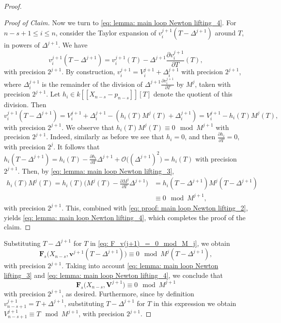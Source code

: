 \documentclass[pdflatex,sn-basic]{sn-jnl}%
\theoremstyle{thmstyleone}%
\theoremstyle{thmstyletwo}%
\theoremstyle{thmstylethree}%
\theoremstyle{definition}
\numberwithin{equation}{section}
\newcommand{\bfs}{\boldsymbol}
\begin{document}
\begin{proof}
\begin{proof}[Proof of Claim]
Now we turn to \eqref{eq: lemma: main loop Newton
lifting_4}. For $n-s+1\le i\le n$, consider the Taylor expansion of
$v^{j+1}_i(T-\Delta^{j+1})$ around $T$, in
powers of $\Delta^{j+1}$. We have
$$
v^{j+1}_i(T-\Delta^{j+1})=v^{j+1}_i(T)-\Delta^{j+1}\frac{\partial v^{j+1}_i}{\partial T}(T),
$$
with precision $2^{j+1}$. By construction,
$v^{j+1}_i=V^{j+1}_i+\Delta^{j+1}_i$ with precision $2^{j+1}$, where
$\Delta^{j+1}_{i}$ is the remainder of the division of
$\Delta^{j+1}\frac{\partial v^{j+1}_i}{\partial T}$ by $M^j$, taken
with precision $2^{j+1}$. Let $h_i\in k[\![X_{n-s}-p_{n-s}]\!][T]$
denote the quotient of this division. Then
%
\begin{equation}\label{eq: proof: main loop Newton lifting_2}v^{j+1}_i(T-\Delta^{j+1})=V_i^{j+1}+\Delta^{j+1}_i-(h_i(T)M^j(T)+\Delta_i^{j+1})
=V_i^{j+1}-h_i(T)M^j(T),
\end{equation}
%
with precision $2^{j+1}$. We observe that $h_i(T)M^j(T)\equiv 0\mod
M^{j+1}$ with precision $2^{j+1}$. Indeed, similarly as before we
see that $h_i=0$, and then $\frac{\partial h_i}{\partial T}=0$, with
precision $2^{j}$. It follows that $
h_i(T-\Delta^{j+1})=h_i(T)-\frac{\partial h_i}{\partial
T}\Delta^{j+1} + \mathcal{O}\big((\Delta^{j+1})^2\big)=h_i(T) $ with
precision $2^{j+1}$. Then, by \eqref{eq: lemma: main loop Newton
lifting_3},
%
\begin{align*}
h_i(T)M^j(T)=h_i(T)\Big(M^j(T)-\frac{\partial M^j}{\partial T}\Delta^{j+1}\Big)&=
h_i(T-\Delta^{j+1})M^j(T-\Delta^{j+1})\\&\equiv 0\mod M^{j+1},
\end{align*}
%
with precision $2^{j+1}$. This, combined with \eqref{eq: proof: main
loop Newton lifting_2}, yields \eqref{eq: lemma: main loop Newton
lifting_4}, which completes the proof of the claim.
\end{proof}

Substituting $T-\Delta^{j+1}$ for $T$ in
\eqref{eq: F_v(j+1)_=_0_mod_M_j}, we obtain
%
\begin{equation}\label{eq: F_v(j+1)_=_0_mod_M_j_1}
\bfs F_s\big(X_{n-s}, \bfs v^{j+1}(T-\Delta^{j+1})\big)\equiv 0 \mod M^{j}(T-\Delta^{j+1}),
\end{equation}
%
with precision $2^{j+1}$. Taking into account \eqref{eq: lemma: main
loop Newton lifting_3} and \eqref{eq: lemma: main loop Newton
lifting_4}, we conclude that $$\bfs F_s\big(X_{n-s}, \bfs V^{j+1}
\big) \equiv 0 \mod M^{j+1}$$ with precision $2^{j+1}$, as desired.
Furthermore, since by definition $v^{j+1}_{n-s+1}=T+\Delta^{j+1}$,
substituting $T-\Delta^{j+1}$ for $T$ in this expression we obtain
$V^{j+1}_{n-s+1}\equiv T \mod M^{j+1}$, with precision $2^{j+1}$.


\end{proof}
\end{document}
